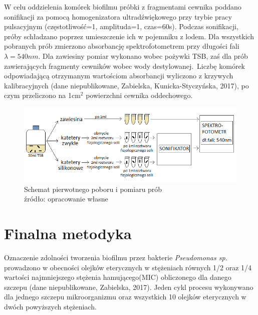 \documentclass[11pt,a4paper]{report}
\begin{document}
W celu oddzielenia komórek biofilmu próbki z fragmentami cewnika poddano sonifikacji za pomocą homogenizatora ultradźwiękowego przy trybie pracy pulsacyjnym (częstotliwość=1, amplituda=1, czas=60s). Podczas sonifikacji, próby schładzano poprzez umieszczenie ich w pojemniku z lodem.
Dla wszystkich pobranych prób zmierzono absorbancję spektrofotometrem przy długości fali $\lambda = 540nm$. Dla zawiesiny pomiar wykonano wobec pożywki TSB, zaś dla prób zawierających fragmenty cewników wobec wody destylowanej.\
Liczbę komórek odpowiadającą otrzymanym wartościom absorbancji wyliczono z krzywych kalibracyjnych (dane niepublikowane, Zabielska, Kunicka-Styczyńska, 2017), po czym przeliczono na 1cm$^2$ powierzchni cewnika oddechowego.\\

\begin{figure}[!h]

\begin{center}
\includegraphics[scale=0.7]{img/pomiar_stare.png}
\caption{Schemat pierwotnego poboru i pomiaru prób\\
źródło: opracowanie własne}\label{pomiar_stare}
\end{center} 
\end{figure}

\clearpage
\section{Finalna metodyka}

Oznaczenie zdolności tworzenia biofilmu przez bakterie \textit{Pseudomonas sp.} prowadzono w obecności olejków eterycznych w stężeniach równych 1/2 oraz 1/4 wartości najmniejszego stężenia hamującego(MIC) obliczonego dla danego szczepu (dane niepublikowane, Zabielska, 2017).
Jeden cykl procesu wykonywano dla jednego szczepu mikroorganizmu oraz wszystkich 10 olejków eterycznych w dwóch powyższych stężeniach.\
\end{document}
